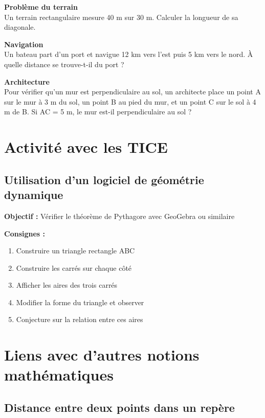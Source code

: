 \begin{exercice}{5}
\textbf{Problème du terrain}\\
Un terrain rectangulaire mesure 40 m sur 30 m. Calculer la longueur de sa diagonale.
\end{exercice}

\begin{exercice}{6}
\textbf{Navigation}\\
Un bateau part d'un port et navigue 12 km vers l'est puis 5 km vers le nord. À quelle distance se trouve-t-il du port ?
\end{exercice}

\begin{exercice}{7}
\textbf{Architecture}\\
Pour vérifier qu'un mur est perpendiculaire au sol, un architecte place un point A sur le mur à 3 m du sol, un point B au pied du mur, et un point C sur le sol à 4 m de B. Si AC = 5 m, le mur est-il perpendiculaire au sol ?
\end{exercice}

\section{Activité avec les TICE}

\subsection{Utilisation d'un logiciel de géométrie dynamique}

\textbf{Objectif :} Vérifier le théorème de Pythagore avec GeoGebra ou similaire

\textbf{Consignes :}
\begin{enumerate}
    \item Construire un triangle rectangle ABC
    \item Construire les carrés sur chaque côté
    \item Afficher les aires des trois carrés
    \item Modifier la forme du triangle et observer
    \item Conjecture sur la relation entre ces aires
\end{enumerate}

\section{Liens avec d'autres notions mathématiques}

\subsection{Distance entre deux points dans un repère}

